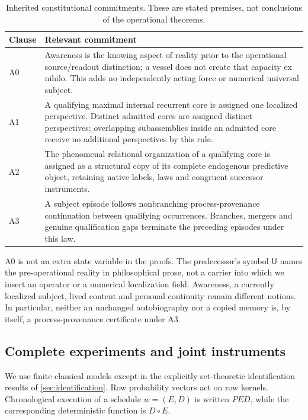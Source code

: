 \begin{table}[tb]
\centering\small
\caption{Inherited constitutional commitments. These are stated premises, not conclusions of the operational theorems.}\label{tab:axioms}
\begin{tabularx}{\linewidth}{@{}p{.09\linewidth}Y@{}}\toprule
Clause & Relevant commitment\\\midrule
A0 & Awareness is the knowing aspect of reality prior to the operational source/readout distinction; a vessel does not create that capacity ex nihilo. This adds no independently acting force or numerical universal subject.\\[3pt]
A1 & A qualifying maximal internal recurrent core is assigned one localized perspective. Distinct admitted cores are assigned distinct perspectives; overlapping subassemblies inside an admitted core receive no additional perspectives by this rule.\\[3pt]
A2 & The phenomenal relational organization of a qualifying core is assigned as a structural copy of its complete endogenous predictive object, retaining native labels, laws and congruent successor instruments.\\[3pt]
A3 & A subject episode follows nonbranching process-provenance continuation between qualifying occurrences. Branches, mergers and genuine qualification gaps terminate the preceding episodes under this law.\\\bottomrule
\end{tabularx}
\end{table}

A0 is not an extra state variable in the proofs. The predecessor's symbol \(\mathsf U\) names the pre-operational reality in philosophical prose, not a carrier into which we insert an operator or a numerical localization field. Awareness, a currently localized subject, lived content and personal continuity remain different notions. In particular, neither an unchanged autobiography nor a copied memory is, by itself, a process-provenance certificate under A3.

\subsection{Complete experiments and joint instruments}
We use finite classical models except in the explicitly set-theoretic identification results of \cref{sec:identification}. Row probability vectors act on row kernels. Chronological execution of a schedule \(w=(E,D)\) is written \(PED\), while the corresponding deterministic function is \(D\circ E\).

